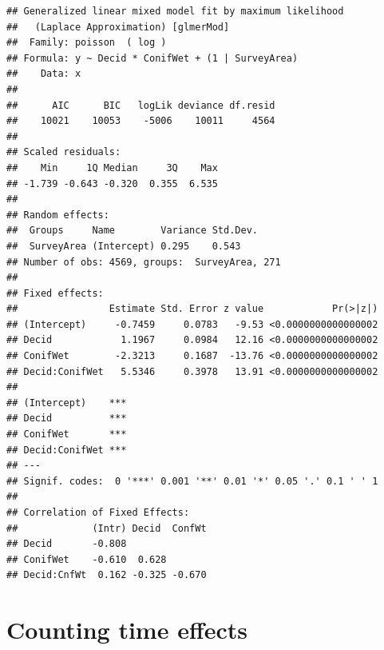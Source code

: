 \documentclass[12pt,]{book}
\newenvironment{Shaded}{\begin{snugshade}}{\end{snugshade}}
\newcommand{\CommentTok}[1]{\textcolor[rgb]{0.56,0.35,0.01}{\textit{#1}}}
\newcommand{\KeywordTok}[1]{\textcolor[rgb]{0.13,0.29,0.53}{\textbf{#1}}}
\newcommand{\NormalTok}[1]{#1}
\newcommand{\OperatorTok}[1]{\textcolor[rgb]{0.81,0.36,0.00}{\textbf{#1}}}
\newcommand{\StringTok}[1]{\textcolor[rgb]{0.31,0.60,0.02}{#1}}
\begin{document}
\begin{verbatim}
## Generalized linear mixed model fit by maximum likelihood
##   (Laplace Approximation) [glmerMod]
##  Family: poisson  ( log )
## Formula: y ~ Decid * ConifWet + (1 | SurveyArea)
##    Data: x
## 
##      AIC      BIC   logLik deviance df.resid 
##    10021    10053    -5006    10011     4564 
## 
## Scaled residuals: 
##    Min     1Q Median     3Q    Max 
## -1.739 -0.643 -0.320  0.355  6.535 
## 
## Random effects:
##  Groups     Name        Variance Std.Dev.
##  SurveyArea (Intercept) 0.295    0.543   
## Number of obs: 4569, groups:  SurveyArea, 271
## 
## Fixed effects:
##                Estimate Std. Error z value            Pr(>|z|)
## (Intercept)     -0.7459     0.0783   -9.53 <0.0000000000000002
## Decid            1.1967     0.0984   12.16 <0.0000000000000002
## ConifWet        -2.3213     0.1687  -13.76 <0.0000000000000002
## Decid:ConifWet   5.5346     0.3978   13.91 <0.0000000000000002
##                   
## (Intercept)    ***
## Decid          ***
## ConifWet       ***
## Decid:ConifWet ***
## ---
## Signif. codes:  0 '***' 0.001 '**' 0.01 '*' 0.05 '.' 0.1 ' ' 1
## 
## Correlation of Fixed Effects:
##             (Intr) Decid  ConfWt
## Decid       -0.808              
## ConifWet    -0.610  0.628       
## Decid:CnfWt  0.162 -0.325 -0.670
\end{verbatim}

\hypertarget{counting-time-effects}{%
\section{Counting time effects}\label{counting-time-effects}}

\begin{Shaded}
\end{Shaded}
\end{document}
